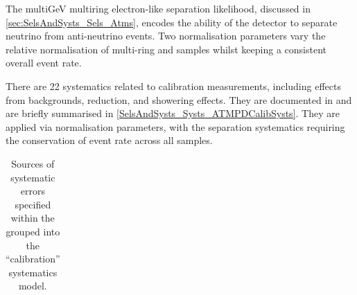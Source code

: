 The multiGeV multiring electron-like separation likelihood, discussed in \autoref{sec:SelsAndSysts_Sels_Atms}, encodes the ability of the detector to separate neutrino from anti-neutrino events. Two normalisation parameters vary the relative normalisation of multi-ring  and  samples whilst keeping a consistent overall event rate.

There are 22 systematics related to calibration measurements, including effects from backgrounds, reduction, and showering effects. They are documented in \cite{Jiang2019-iw} and are briefly summarised in \autoref{SelsAndSysts_Systs_ATMPDCalibSysts}. They are applied via normalisation parameters, with the separation systematics requiring the conservation of event rate across all samples.

\begin{table}[ht!]
  \centering
  \caption{Sources of systematic errors specified within the grouped into the ``calibration'' systematics model.}
  \label{SelsAndSysts_Systs_ATMPDCalibSysts}
		
  \begin{tabular}{ll} 
    

\end{tabular}
\end{table}
